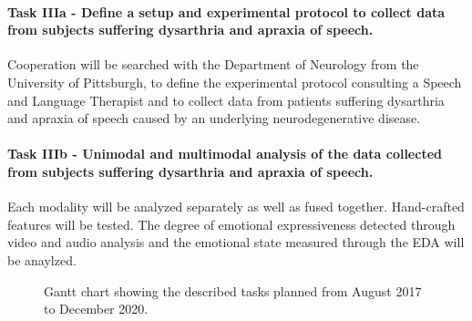 \paragraph{Task IIIa - Define a setup and experimental protocol to collect data from subjects suffering dysarthria and apraxia of speech.} 
Cooperation will be searched with the Department of Neurology  from the University of Pittsburgh, to define the experimental protocol consulting a Speech and Language Therapist and to collect data from patients suffering dysarthria and apraxia of speech caused by an underlying neurodegenerative disease. 

\paragraph{Task IIIb - Unimodal and multimodal analysis of the data collected from subjects suffering dysarthria and apraxia of speech.}
Each modality will be analyzed separately as well as fused together. Hand-crafted features will be tested. The degree of emotional expressiveness detected through video and audio analysis and the emotional state measured through the EDA will be anaylzed.




\begin{figure}
\centering
{}
\caption{Gantt chart showing the described tasks planned from August 2017 to December 2020.}
\end{figure}




